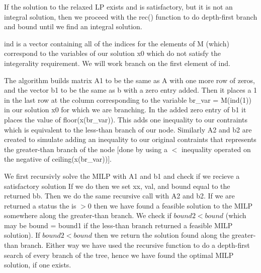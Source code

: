 \documentclass{article}
\begin{document}
\begin{itemize}
If the solution to the relaxed LP exists and is satisfactory, but it is
        not an integral solution, then we proceed with the rec() function
        to do depth-first branch and bound until we find an integral solution.
\vspace{.1in}

ind is a vector containing all of the indices for the elements of M (which)
        correspond to the variables of our solution x0 which do not satisfy
        the integerality requirement. We will work branch on the first element
        of ind.
\vspace{.1in}

The algorithm builds matrix A1 to be the same as A with one more row of
        zeros, and the vector b1 to be the same as b with a zero entry added.
        Then it places a 1 in the last row at the column corresponding to the
        variable br\_var = M(ind(1)) in our solution x0 for which we are branching. In the added
        zero entry of b1 it places the value of floor(x(br\_var)). This adds one inequality to our contraints
        which is equivalent to the less-than branch of our node. Similarly A2 and b2 are created to simulate adding
        an inequality to our original contraints that represents the greater-than branch of the node [done by using a $<$ inequality
        operated on the negative of ceiling(x(br\_var))].
\vspace{.1in}

We first recursivly solve the MILP with A1 and b1 and check if we recieve a satisfactory solution If we do then we set xx, val, and bound
        equal to the returned bb. Then we do the same recursive call with A2 and b2. If we are returned a status the is $>0$ then we have found a
        feasible solution to the MILP somewhere along the greater-than branch. We check if $bound2 < bound$ (which may be bound = bound1 if the
        less-than branch returned a feasible MILP solution). If $bound2 < bound$ then we return the solution found along the greater-than branch.
        Either way we have used the recursive function to do a depth-first search of every branch of the tree, hence we have found the optimal
        MILP solution, if one exists.
\vspace{.2in}


\end{itemize}
\end{document}
